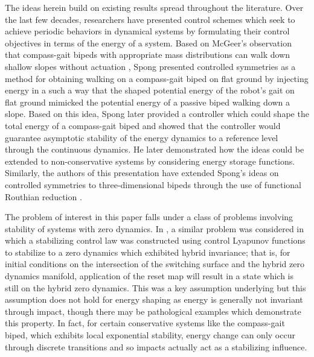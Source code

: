 \documentclass[english]{article}
\begin{document}
% 
The ideas herein build on existing results spread throughout the literature.
%
Over the last few decades, researchers have presented control schemes which seek
to achieve periodic behaviors in dynamical systems by formulating their control
objectives in terms of the energy of a system.
%
Based on McGeer's observation that compass-gait bipeds with appropriate mass
distributions can walk down shallow slopes without actuation \cite{McGeer1990},
Spong presented controlled symmetries \cite{Spong2005} as a method for obtaining
walking on a compass-gait biped on flat ground by injecting energy in a such a
way that the shaped potential energy of the robot's gait on flat ground mimicked
the potential energy of a passive biped walking down a slope.
% 
Based on this idea, Spong later provided a controller which could shape the
total energy of a compass-gait biped and showed that the controller would
guarantee asymptotic stability of the energy dynamics to a reference level
through the continuous dynamics.
%
He later demonstrated how the ideas could be extended to non-conservative
systems \cite{Spong2007} by considering energy storage functions.
%
Similarly, the authors of this presentation have extended Spong's ideas on
controlled symmetries to three-dimensional bipeds through the use of functional
Routhian reduction \cite{Grizzle2014}.


The problem of interest in this paper falls under a class of problems involving
stability of systems with zero dynamics.
%
In \cite{Ames2014}, a similar problem was considered in which a stabilizing
control law was constructed using control Lyapunov functions to stabilize to a
zero dynamics which exhibited hybrid invariance; that is, for initial conditions
on the intersection of the switching surface and the hybrid zero dynamics
manifold, application of the reset map will result in a state which is still on
the hybrid zero dynamics.
%
This was a key assumption underlying \cite{Ames2014} but this assumption does
not hold for energy shaping as energy is generally not invariant through impact,
though there may be pathological examples which demonstrate this property.
%
In fact, for certain conservative systems like the compass-gait biped, which
exhibits local exponential stability, energy change can only occur through
discrete transitions and so impacts actually act as a stabilizing influence.
%
%
%



\end{document}
